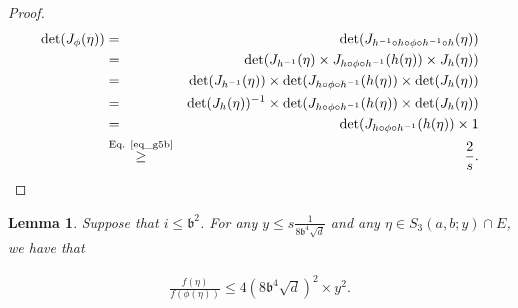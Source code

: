\documentclass[11pt,letterpaper]{article}
\newtheorem{lemma}[theorem]{Lemma}
\begin{document}
\begin{proof}
\begin{eqnarray*}
    \mathrm{det}(J_{\phi}(\eta)) &= &  \mathrm{det}(J_{  h^{-1} \circ h \circ \phi \circ h^{-1} \circ h}(\eta)) \\ 
    &=& \mathrm{det}( J_{h^{-1}}(\eta) \times J_{h \circ \phi \circ h^{-1}}(h(\eta))  \times J_{h}(\eta))\\
    &= & \mathrm{det}(J_{h^{-1}}(\eta)) \times \mathrm{det}(J_{h \circ \phi \circ h^{-1}}(h(\eta))  \times \mathrm{det}(J_{h}(\eta))\\
        &= & \mathrm{det}(J_{h}(\eta))^{-1} \times \mathrm{det}(J_{h \circ \phi \circ h^{-1}}(h(\eta))  \times \mathrm{det}(J_{h}(\eta))\\
    &=&\mathrm{det}(J_{h \circ \phi \circ h^{-1}}(h(\eta))  \times 1\\
    &\stackrel{\textrm{Eq. \eqref{eq_g5b}}}{\geq}&  \frac{2}{s}.
\end{eqnarray*}
%
\end{proof}





\begin{lemma}\label{lemma_density_ratio_edge}
Suppose that  $ i \leq \mathfrak{b}^2$. 
%
For any $y \leq s\frac{1}{8\mathfrak{b}^4\sqrt{d} }$ and any $\eta\in  S_3(a,b;y) \cap E$, we have that

\begin{align*}
  \frac{f(\eta)}{f(\phi(\eta))} \leq 4 (8 \mathfrak{b}^4 \sqrt{d})^2 \times y^2.
\end{align*}
\end{lemma}
\end{document}
